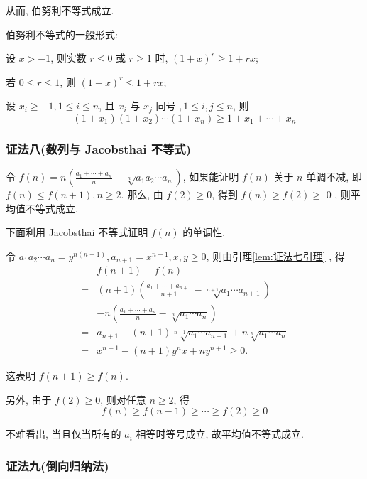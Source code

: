 从而, 伯努利不等式成立.

\begin{note}
伯努利不等式的一般形式:

设 $x>-1$, 则实数 $r \leqslant 0$ 或 $r \geqslant 1$ 时, $(1+x)^{r} \geqslant 1+r x$;

若 $0 \leqslant r \leqslant 1$, 则 $(1+x)^{r} \leqslant 1+r x$;

设 $x_{i} \geqslant-1,1 \leqslant i \leqslant n$, 且 $x_{i}$ 与 $x_{j}$ 同号 $, 1 \leqslant i, j \leqslant n$, 则
$$
\left(1+x_{1}\right)\left(1+x_{2}\right) \cdots\left(1+x_{n}\right) \geqslant 1+x_{1}+\cdots+x_{n}
$$
\end{note}

\subsubsection*{证法八(数列与 Jacobsthai 不等式)}

令 $f(n)=n\left(\frac{a_{1}+\cdots+a_{n}}{n}-\sqrt[n]{a_{1} a_{2} \cdots a_{n}}\right)$, 如果能证明 $f(n)$ 关于 $n$ 单调不减, 即 $f(n) \leqslant f(n+1), n \geqslant 2$. 那么, 由 $f(2) \geqslant 0$, 得到 $f(n) \geqslant f(2) \geqslant$ 0 , 则平均值不等式成立.

下面利用 Jacobsthai 不等式证明 $f(n)$ 的单调性.

令 $a_{1} a_{2} \cdots a_{n}=y^{n(n+1)}, a_{n+1}=x^{n+1}, x, y \geqslant 0$, 则由引理\ref{lem:证法七引理} , 得
$$
\begin{aligned}
& f(n+1)-f(n) \\
= & (n+1)\left(\frac{a_{1}+\cdots+a_{n+1}}{n+1}-\sqrt[n+1]{a_{1} \cdots a_{n+1}}\right) \\
& -n\left(\frac{a_{1}+\cdots+a_{n}}{n}-\sqrt[n]{a_{1} \cdots a_{n}}\right) \\
= & a_{n+1}-(n+1) \sqrt[n+1]{a_{1} \cdots a_{n+1}}+n \sqrt[n]{a_{1} \cdots a_{n}} \\
= & x^{n+1}-(n+1) y^{n} x+n y^{n+1} \geqslant 0 .
\end{aligned}
$$

这表明 $f(n+1) \geqslant f(n)$.

另外, 由于 $f(2) \geqslant 0$, 则对任意 $n \geqslant 2$, 得
$$
f(n) \geqslant f(n-1) \geqslant \cdots \geqslant f(2) \geqslant 0
$$

不难看出, 当且仅当所有的 $a_{i}$ 相等时等号成立, 故平均值不等式成立.

\subsubsection*{证法九(倒向归纳法)}

